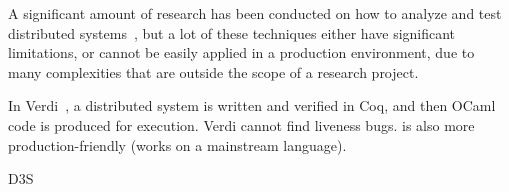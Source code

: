 A significant amount of research has been conducted on how to analyze and test distributed systems~\cite{lamport1994temporal, schuppan2004efficient, killian2007life, gupta2008diecast, yang2009modist}, but a lot of these techniques either have significant limitations, or cannot be easily applied in a production environment, due to many complexities that are outside the scope of a research project.

In Verdi~\cite{wilcox2015verdi}, a distributed system is written and verified in Coq, and then OCaml code is produced for execution. Verdi cannot find liveness bugs. \psharp is also more production-friendly (works on a mainstream language). 

D3S~\cite{liu2008d3s} 